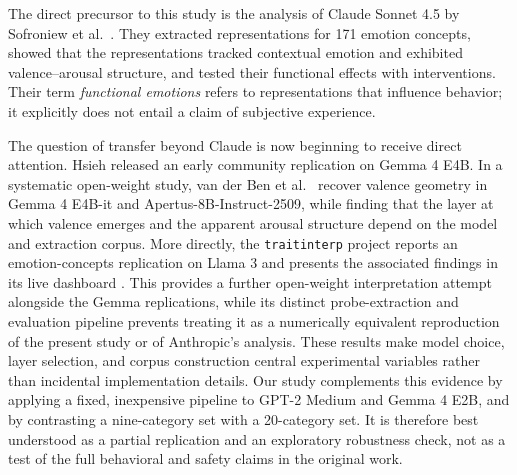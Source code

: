 The direct precursor to this study is the analysis of Claude Sonnet 4.5 by
Sofroniew et al.\ \cite{sofroniew_emotion_2026}.  They extracted representations
for 171 emotion concepts, showed that the representations tracked contextual
emotion and exhibited valence--arousal structure, and tested their functional
effects with interventions.  Their term \emph{functional emotions} refers to
representations that influence behavior; it explicitly does not entail a claim
of subjective experience.

The question of transfer beyond Claude is now beginning to receive direct
attention.  Hsieh \cite{hsieh_replicating_2026} released an early community
replication on Gemma 4 E4B.  In a systematic open-weight study, van der Ben et
al.\ \cite{ben_where_2026} recover valence geometry in Gemma 4 E4B-it and
Apertus-8B-Instruct-2509, while finding that the layer at which valence emerges
and the apparent arousal structure depend on the model and extraction corpus.
More directly, the \texttt{traitinterp} project reports an emotion-concepts
replication on Llama 3 and presents the associated findings in its live
dashboard \cite{ewernn_traininterp_2026}. This provides a further open-weight
interpretation attempt alongside the Gemma replications, while its distinct
probe-extraction and evaluation pipeline prevents treating it as a numerically
equivalent reproduction of the present study or of Anthropic's analysis.
These results make model choice, layer selection, and corpus construction
central experimental variables rather than incidental implementation details.
Our study complements this evidence by applying a fixed, inexpensive pipeline
to GPT-2 Medium and Gemma 4 E2B, and by contrasting a nine-category set with a
20-category set.  It is therefore best understood as a partial replication and
an exploratory robustness check, not as a test of the full behavioral and
safety claims in the original work.

